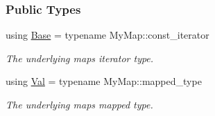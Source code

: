 \subsubsection*{Public Types}
\begin{DoxyCompactItemize}
\item 
using \hyperlink{structslb_1_1core_1_1util_1_1MapValConstIterator_aff0eec057adf9aa4faa210e9b4d7fe2a}{Base} = typename My\+Map\+::const\+\_\+iterator\hypertarget{structslb_1_1core_1_1util_1_1MapValConstIterator_aff0eec057adf9aa4faa210e9b4d7fe2a}{}\label{structslb_1_1core_1_1util_1_1MapValConstIterator_aff0eec057adf9aa4faa210e9b4d7fe2a}

\begin{DoxyCompactList}\small\item\em The underlying map\textquotesingle{}s iterator type. \end{DoxyCompactList}\item 
using \hyperlink{structslb_1_1core_1_1util_1_1MapValConstIterator_a61fb33250db807633298a4e573695e5b}{Val} = typename My\+Map\+::mapped\+\_\+type\hypertarget{structslb_1_1core_1_1util_1_1MapValConstIterator_a61fb33250db807633298a4e573695e5b}{}\label{structslb_1_1core_1_1util_1_1MapValConstIterator_a61fb33250db807633298a4e573695e5b}

\begin{DoxyCompactList}\small\item\em The underlying map\textquotesingle{}s mapped type. \end{DoxyCompactList}\end{DoxyCompactItemize}
